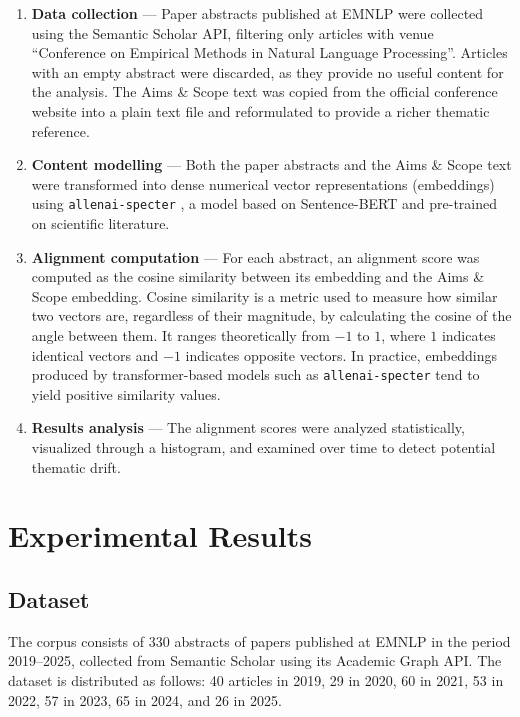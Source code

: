 \documentclass[pdflatex,sn-mathphys-num]{sn-jnl}%
\theoremstyle{thmstyleone}%
\theoremstyle{thmstyletwo}%
\theoremstyle{thmstylethree}%
\begin{document}
\begin{enumerate}

\item \textbf{Data collection} --- Paper abstracts published at EMNLP 
were collected using the Semantic Scholar API, filtering only articles 
with venue ``Conference on Empirical Methods in Natural Language 
Processing''. Articles with an empty abstract were discarded, as they 
provide no useful content for the analysis. The Aims \& Scope text was 
copied from the official conference website into a plain text file and 
reformulated to provide a richer thematic reference.

\item \textbf{Content modelling} --- Both the paper abstracts and the 
Aims \& Scope text were transformed into dense numerical vector 
representations (embeddings) using \texttt{allenai-specter} 
\cite{specter2020}, a model based on Sentence-BERT \cite{reimers2019} 
and pre-trained on scientific literature.

\item \textbf{Alignment computation} --- For each abstract, an 
alignment score was computed as the cosine similarity between its 
embedding and the Aims \& Scope embedding. Cosine similarity is a 
metric used to measure how similar two vectors are, regardless of their 
magnitude, by calculating the cosine of the angle between them. It 
ranges theoretically from $-1$ to $1$, where $1$ indicates identical 
vectors and $-1$ indicates opposite vectors. In practice, embeddings 
produced by transformer-based models such as \texttt{allenai-specter} 
tend to yield positive similarity values.

\item \textbf{Results analysis} --- The alignment scores were analyzed 
statistically, visualized through a histogram, and examined over time 
to detect potential thematic drift.

\end{enumerate}

\newpage
\section{Experimental Results}\label{sec3}

\subsection{Dataset}

The corpus consists of 330 abstracts of papers published at EMNLP 
in the period 2019--2025, collected from Semantic Scholar using its 
Academic Graph API. The dataset is distributed as follows: 40 articles 
in 2019, 29 in 2020, 60 in 2021, 53 in 2022, 57 in 2023, 65 in 2024, 
and 26 in 2025.
\end{document}
